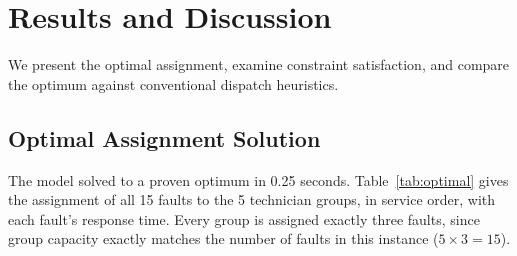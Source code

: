 \documentclass[11pt]{article}
\begin{document}
\section*{Results and Discussion}

We present the optimal assignment, examine constraint satisfaction, and compare the optimum against conventional dispatch heuristics.

\subsection*{Optimal Assignment Solution}

The model solved to a proven optimum in 0.25 seconds. Table~\ref{tab:optimal} gives the assignment of all 15 faults to the 5 technician groups, in service order, with each fault's response time. Every group is assigned exactly three faults, since group capacity exactly matches the number of faults in this instance ($5 \times 3 = 15$).
\end{document}
